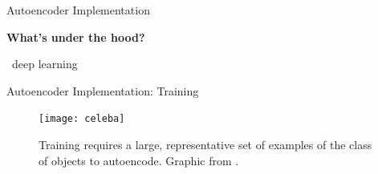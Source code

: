 \begin{frame}{Autoencoder Implementation}

\Large

\textbf{What's under the hood?}

\pause

\vspace{3ex}
\centering

\HUGE
{}%
~deep learning

\normalsize
{}

\end{frame}

\begin{frame}{Autoencoder Implementation: Training}
\begin{figure}
\texttt{[image: celeba]}
\caption{
Training requires a large, representative set of examples of the class of objects to autoencode.
Graphic from \cite{liu2015faceattributes}.
}
\end{figure}
\end{frame}
